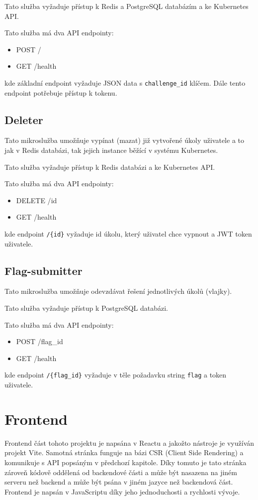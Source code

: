 \documentclass[12pt, a4paper,
oneside,      %
openright
]{report}
\begin{document}
Tato služba vyžaduje přístup k Redis a PostgreSQL databázím a ke Kubernetes API.

Tato služba má dva API endpointy:
\begin{itemize}
	\item POST /
	\item GET /health
\end{itemize}
kde základní endpoint vyžaduje JSON data s \texttt{challenge\_id} klíčem. Dále tento endpoint potřebuje přístup k tokenu.

\section{Deleter}
Tato mikroslužba umožňuje vypínat (mazat) již vytvořené úkoly uživatele a to jak v Redis databázi, tak jejich instance běžící v systému Kubernetes.

Tato služba vyžaduje přístup k Redis databázi a ke Kubernetes API.

Tato služba má dva API endpointy:
\begin{itemize}
	\item DELETE /{id}
	\item GET /health
\end{itemize}
kde endpoint \texttt{/\{id\}} vyžaduje id úkolu, který uživatel chce vypnout a JWT token uživatele.

\section{Flag-submitter}
Tato mikroslužba umožňuje odevzdávat řešení jednotlivých úkolů (vlajky).

Tato služba vyžaduje přístup k PostgreSQL databázi.

Tato služba má dva API endpointy:
\begin{itemize}
	\item POST /{flag\_id}
	\item GET /health
\end{itemize}
kde endpoint \texttt{/\{flag\_id\}} vyžaduje v těle požadavku string \texttt{flag} a token uživatele.

\chapter{Frontend}
Frontend část tohoto projektu je napsána v Reactu a jakožto nástroje je využíván projekt Vite. Samotná stránka funguje na bázi CSR (Client Side Rendering) a komunikuje s API popsáným v předchozí kapitole. Díky tomuto je tato stránka zároveň kódově oddělená od backendové části a může být nasazena na jiném serveru než backend a může být psána v jiném jazyce než backendová část. Frontend je napsán v JavaScriptu díky jeho jednoduchosti a rychlosti vývoje.
\end{document}
